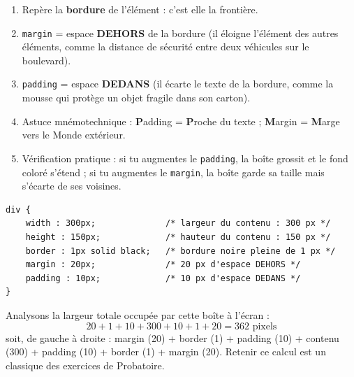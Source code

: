 \documentclass[11pt]{article}
\begin{document}
\begin{methode}
\begin{enumerate}
\item Repère la \textbf{bordure} de l'élément : c'est elle la frontière.
\item \texttt{margin} = espace \textbf{DEHORS} de la bordure (il éloigne l'élément des autres éléments, comme la distance de sécurité entre deux véhicules sur le boulevard).
\item \texttt{padding} = espace \textbf{DEDANS} (il écarte le texte de la bordure, comme la mousse qui protège un objet fragile dans son carton).
\item Astuce mnémotechnique : \textbf{P}adding = \textbf{P}roche du texte ; \textbf{M}argin = \textbf{M}arge vers le Monde extérieur.
\item Vérification pratique : si tu augmentes le \texttt{padding}, la boîte grossit et le fond coloré s'étend ; si tu augmentes le \texttt{margin}, la boîte garde sa taille mais s'écarte de ses voisines.
\end{enumerate}
\end{methode}

\begin{exemplebox}
\begin{lstlisting}
div {
    width : 300px;              /* largeur du contenu : 300 px */
    height : 150px;             /* hauteur du contenu : 150 px */
    border : 1px solid black;   /* bordure noire pleine de 1 px */
    margin : 20px;              /* 20 px d'espace DEHORS */
    padding : 10px;             /* 10 px d'espace DEDANS */
}
\end{lstlisting}
Analysons la largeur totale occupée par cette boîte à l'écran :
\[ 20 + 1 + 10 + 300 + 10 + 1 + 20 = 362 \text{ pixels} \]
soit, de gauche à droite : margin (20) + border (1) + padding (10) + contenu (300) + padding (10) + border (1) + margin (20). Retenir ce calcul est un classique des exercices de Probatoire.
\end{exemplebox}
\end{document}
